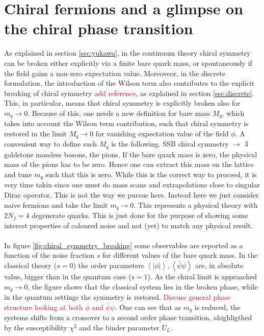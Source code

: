 \newpage
\section{Chiral fermions and a glimpse on the chiral phase transition}
\label{sec:chiral}

As explained in section \ref{sec:yukawa}, in the continuum theory chiral symmetry can be broken either explicitly via a finite bare quark mass, or spontaneously if the field gains a non-zero expectation value. Moreoveor, in the discrete formulation, the introduction of the Wilson term also contributes to the explicit breaking of chiral symmetry \textcolor{red}{add reference}, as explained in section \ref{sec:discrete}. This, in particular, means that chiral symmetry is explicitly broken also for $m_q \to 0$. Because of this, one needs a new definition for bare mass $M_q$, which takes into account the Wilson term contribution, such that chiral symmetry is restored in the limit $M_q \to 0$ for vanishing expectation value of the field $\phi$. A convenient way to define such $M_q$ is the following. SSB chiral symmetry $\to$ 3 goldstone massless bosons, the pions. If the bare quark mass is zero, the physical mass of the pions has to be zero. Hence one can extract this mass on the lattice and tune $m_q$ such that this is zero. While this is the correct way to proceed, it is very time takin since one must do mass scans and extrapolations close to singular Dirac operator. This is not the way we pursue here. Instead here we just consider naive fermions and take the limit $m_q \to 0$. This represents a physical theory with $2N_f = 4$ degenerate quarks. This is just done for the purpose of showing some interest properties of coloured noise and not (yet) to match any physical result. \\~\\
In figure \ref{fig:chiral_symmetry_breaking} some observables are reported as a function of the noise fraction $s$ for different values of the bare quark mass. In the classical theory ($s=0$) the order parameters $\left\langle|\phi|\right\rangle, \left\langle\bar\psi \psi\right\rangle$ are, in absolute value, bigger than in the quantum case ($s=1$).  As the chiral limit is approached $m_q \to 0$, the figure shows that the classical system lies in the broken phase, while in the quantum settings the symmetry is restored. \textcolor{red}{Discuss general phase structure looking at both $\phi$ and $\bar\psi\psi$}. One can see that as $m_q$ is reduced, the systems shifts from a crossover to a second order phase transition, ahighligthed by the susceptibility $\chi^2$ and the binder parameter $U_L$.

